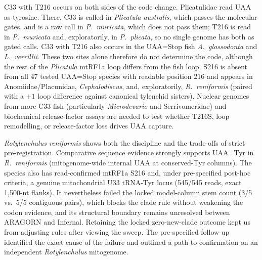 \documentclass[11pt, a4paper]{article}
\begin{document}
C33 with T216 occurs on both sides of the code change. Plicatulidae read UAA as tyrosine. There, C33 is called in \textit{Plicatula australis}, which passes the molecular gates, and is a raw call in \textit{P.\ muricata}, which does not pass them; T216 is read in \textit{P.\ muricata} and, exploratorily, in \textit{P.\ plicata}, so no single genome has both as gated calls. C33 with T216 also occurs in the UAA=Stop fish \textit{A.\ glossodonta} and \textit{L.\ verrillii}. These two sites alone therefore do not determine the code, although the rest of the \textit{Plicatula} mtRF1a loop differs from the fish loop. S216 is absent from all 47 tested UAA=Stop species with readable position 216 and appears in Anomiidae/Placunidae, \textit{Cephalodiscus}, and, exploratorily, \textit{R.\ reniformis} (paired with a $+1$ loop difference against canonical tylenchid sisters). Nuclear genomes from more C33 fish (particularly \textit{Microdevario} and Serrivomeridae) and biochemical release-factor assays are needed to test whether T216S, loop remodelling, or release-factor loss drives UAA capture.

\textit{Rotylenchulus reniformis} shows both the discipline and the trade-offs of strict pre-registration. Comparative sequence evidence strongly supports UAA=Tyr in \textit{R.\ reniformis} (mitogenome-wide internal UAA at conserved-Tyr columns). The species also has read-confirmed mtRF1a S216 and, under pre-specified post-hoc criteria, a genuine mitochondrial U33 tRNA-Tyr locus (545/545 reads, exact 1,500-nt flanks). It nevertheless failed the locked model-column stem count (3/5 vs.\ 5/5 contiguous pairs), which blocks the clade rule without weakening the codon evidence, and its structural boundary remains unresolved between ARAGORN and Infernal. Retaining the locked zero-new-clade outcome kept us from adjusting rules after viewing the sweep. The pre-specified follow-up identified the exact cause of the failure and outlined a path to confirmation on an independent \textit{Rotylenchulus} mitogenome.
\end{document}
